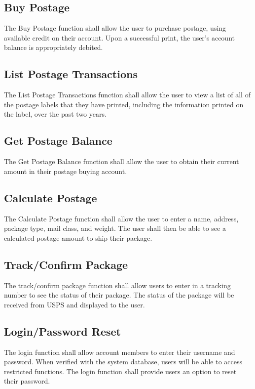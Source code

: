\documentclass{scrreprt}
\begin{document}
\subsection{Buy Postage}

The Buy Postage function shall allow the user to purchase postage, using
available credit on their account. Upon a successful print, the user's account 
balance is appropriately debited.

\subsection{List Postage Transactions}

The List Postage Transactions function shall allow the user to view a list of
all of the postage labels that they have printed, including the information
printed on the label, over the past two years.

\subsection{Get Postage Balance}

The Get Postage Balance function shall allow the user to obtain their current
amount in their postage buying account.

\subsection{Calculate Postage}

The Calculate Postage function shall allow the user to enter a name, address,
package type, mail class, and weight. The user shall then be able to see a
calculated postage amount to ship their package.

\subsection{Track/Confirm Package}

The track/confirm package function shall allow users to enter in a tracking
number to see the status of their package. The status of the package will be
received from USPS  and displayed to the user. 

\subsection{Login/Password Reset}

The login function shall allow account members to enter their username and
password.  When verified with the system database, users will be able to access
restricted functions. The login function shall provide users an option to
reset their password. 
\end{document}
